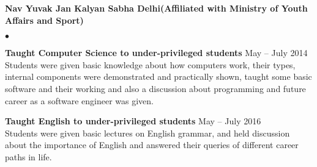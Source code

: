 \documentclass[margin,line]{res}
\newenvironment{list2}{
  \begin{list}{$\bullet$}{%
      \setlength{\itemsep}{0in}
      \setlength{\parsep}{0in} \setlength{\parskip}{0in}
      \setlength{\topsep}{0in} \setlength{\partopsep}{0in}
      \setlength{\leftmargin}{0.2in}}}{\end{list}}
\begin{document}
\begin{resume}
{\bf Nav Yuvak Jan Kalyan Sabha Delhi(Affiliated with Ministry of Youth Affairs and Sport)}\\
\begin{list2}
\item {\bf Taught   Computer Science  to under-privileged students } \hfill May -- July 2014 \\
Students were given basic knowledge about how computers work, their types, internal components were demonstrated and practically shown,  taught some basic software and their working and also a discussion about programming and future career as a software engineer was given.
\item {\bf Taught  English  to under-privileged students}   \hfill May -- July 2016 \\
Students were given basic lectures on English grammar, and held discussion about the importance of English and answered their queries of different career paths in life.
\end{list2}

\end{resume}
\end{document}
